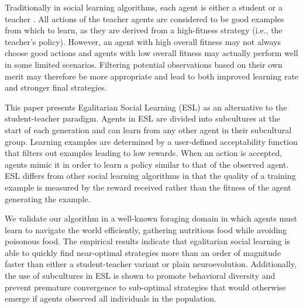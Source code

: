 \documentclass{sig-alternate}
\begin{document}
Traditionally in social learning algorithms, each agent is either a student or a teacher \cite{parisi1997cultural, acerbi2006cultural}. All actions of the teacher agents are considered to be good examples from which to learn, as they are derived from a high-fitness strategy (i.e., the teacher's policy). However, an agent with high overall fitness may not always choose good actions and agents with low overall fitness may actually perform well in some limited scenarios. Filtering potential observations based on their own merit may therefore be more appropriate and lead to both improved learning rate and stronger final strategies.

This paper presents Egalitarian Social Learning (ESL) as an alternative to the student-teacher paradigm. Agents in ESL are divided into subcultures at the start of each generation and can learn from any other agent in their subcultural group. Learning examples are determined by a user-defined acceptability function that filters out examples leading to low rewards. When an action is accepted, agents mimic it in order to learn a policy similar to that of the observed agent. ESL differs from other social learning algorithms in that the quality of a training example is measured by the reward received rather than the fitness of the agent generating the example.


We validate our algorithm in a well-known foraging domain in which agents must learn to navigate the world efficiently, gathering nutritious food while avoiding poisonous food. The empirical results indicate that egalitarian social learning is able to quickly find near-optimal strategies more than an order of magnitude faster than either a student-teacher variant or plain neuroevolution. Additionally, the use of subcultures in ESL is shown to promote behavioral diversity and prevent premature convergence to sub-optimal strategies that would otherwise emerge if agents observed all individuals in the population.
\end{document}

